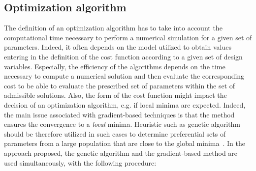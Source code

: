 \subsection{Optimization algorithm}
\label{sec:defalgo}

The definition of an optimization algorithm has to take into account the computational time necessary to perform a numerical simulation for a given set of parameters. Indeed, it often depends on the model utilized to obtain values entering in the definition of the cost function according to a given set of design variables. Especially, the efficiency of the algorithms depends on the time necessary to compute a numerical solution and then evaluate the corresponding cost to be able to evaluate the prescribed set of parameters within the set of admissible solutions. Also, the form of the cost function might impact the decision of an optimization algorithm, e.g. if local minima are expected.
Indeed, the main issue associated with gradient-based techniques is that the method ensures the convergence to a {\it local} minima. Heuristic such as genetic algorithm should be therefore utilized in such cases to determine preferential sets of parameters from a large population that are close to the global minima~\citep{Chaparro.etal.2008}.
In the approach proposed, the genetic algorithm and the gradient-based method are used simultaneously, with the following procedure:

